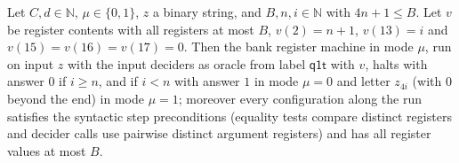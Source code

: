 \begin{theorem}
\label{Complexity.epad_bank_post}
\leanok
{}
Let $C, d \in \mathbb{N}$, $\mu \in \{0,1\}$, $z$ a binary string, and $B, n, i \in \mathbb{N}$
with $4n + 1 \le B$. Let $v$ be register contents with all registers at most $B$, $v(2) = n+1$,
$v(13) = i$ and $v(15) = v(16) = v(17) = 0$. Then the bank register machine in mode $\mu$, run on
input $z$ with the input deciders as oracle from label $\mathsf{q1t}$ with $v$, halts with answer
$0$ if $i \ge n$, and if $i < n$ with answer $1$ in mode $\mu = 0$ and letter $z_{4i}$ (with
$0$ beyond the end) in mode $\mu = 1$; moreover every configuration along the run satisfies the syntactic step preconditions (equality tests compare distinct registers and decider calls use pairwise distinct argument registers) and has all register values at most $B$.
\end{theorem}

